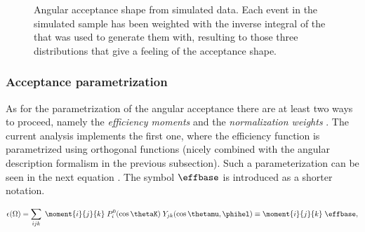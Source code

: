 \begin{figure}[h]
  \centering
  \begin{subfigure}{0.49\textwidth}
    \scalebox{1.3}{}
    \caption{}
    \label{angAcc_ctk}
  \end{subfigure}%
  \hfill%
  \begin{subfigure}{0.49\textwidth}
    \scalebox{1.3}{}
    \caption{}
    \label{angAcc_ctl}
  \end{subfigure}
  \vspace*{0.02\textwidth}
  \begin{subfigure}{0.49\textwidth}
    \scalebox{1.3}{}
    \caption{}
    \label{angAcc_phi}
  \end{subfigure}
  \caption{Angular acceptance shape from simulated data. Each event in the simulated sample has been weighted with the inverse integral
           of the \pdf that was used to generate them with, resulting to those three distributions that give a feeling of the acceptance shape.}
  \label{angAcc_all}
\end{figure}

\subsubsection{Acceptance parametrization}
\label{Acceptance parametrization}
As for the parametrization of the angular acceptance there are at least two ways to proceed,
namely the \emph{efficiency moments} \cite{jeroenThesis} and the \emph{normalization weights} \cite{tristanThesis,jeroenThesis}.
The current analysis implements the first one, where the efficiency function is parametrized using orthogonal functions (nicely
combined with the angular description formalism in the previous subsection). Such a parameterization can be seen in the next equation
. The symbol $\effbase$ is introduced as a shorter notation.

\begin{center}
\begin{equation}
  \epsilon(\Omega) = \sum_{ijk} \; \moment{i}{j}{k} \; P_i^0(\cos\thetaK) \; Y_{jk}(\cos\thetamu,\phihel) \equiv \moment{i}{j}{k} \; \effbase,
  \label{eff_func}
\end{equation}
\end{center}

